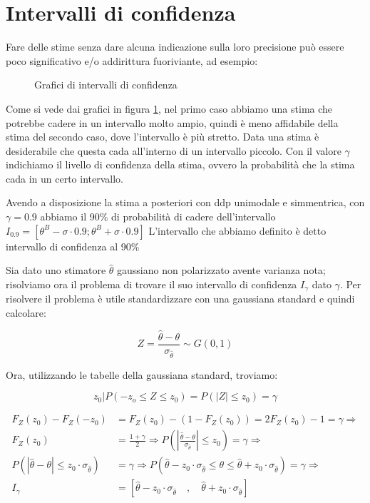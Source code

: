 \section{Intervalli di confidenza}
Fare delle stime senza dare alcuna indicazione sulla loro precisione può essere poco significativo e/o addirittura fuoriviante, ad esempio:

  \begin{figure}[htbp]
    \centering
    \caption{Grafici di intervalli di confidenza \label{fig:grafIntConf}}
  \end{figure}
Come si vede dai grafici in figura \ref{fig:grafIntConf}, nel primo caso abbiamo una stima che potrebbe cadere in un intervallo molto ampio, quindi è meno affidabile della stima del secondo caso, dove l'intervallo è più stretto.\newline
Data una stima è desiderabile che questa cada all'interno di un intervallo piccolo. Con il valore $\gamma$ indichiamo il livello di confidenza della stima, ovvero la probabilità che la stima cada in un certo intervallo.


\begin{esempio} %
Avendo a disposizione la stima a posteriori con ddp unimodale e simmentrica, con $\gamma=0.9$ abbiamo il 90\% di probabilità di cadere dell'intervallo $I_{0.9}=[\theta^B-\sigma \cdot 0.9 ; \theta^B + \sigma \cdot 0.9]$ \newline
[grafico]\newline
L'intervallo che abbiamo definito è detto intervallo di confidenza al 90\%
\end{esempio}

Sia dato uno stimatore $\hat{\theta}$ gaussiano non polarizzato avente varianza nota; risolviamo ora il problema di trovare il suo intervallo di confidenza $I_\gamma$ dato $\gamma$. Per risolvere il problema è utile standardizzare con una gaussiana standard e quindi calcolare:

  \[ Z=\frac{\hat{\theta}-\theta}{\sigma_{\hat{\theta}}}\sim G(0,1) \]
  
Ora, utilizzando le tabelle della gaussiana standard, troviamo:

  \[  z_0 | P(-z_o \leq Z \leq z_0)=P(\left| Z \right| \leq z_0 )=\gamma \]
  
  \[ 
    \begin{split}
      F_Z(z_0)-F_Z(-z_0) & =F_Z(z_0)-(1-F_Z(z_0))=2F_Z(z_0)-1=\gamma \Rightarrow \\
      F_Z(z_0) & =\frac{1+\gamma}{2} \Rightarrow P\left(\left| \frac{\hat{\theta}-\theta}{\sigma_{\hat{\theta}}} \right| \leq z_0 \right)=\gamma \Rightarrow \\
      P\left(\left| {\hat{\theta}-\theta}\right|\leq z_0\cdot \sigma_{\hat{\theta}} \right) & =\gamma\Rightarrow P(\hat{\theta}-z_0\cdot\sigma_{\hat{\theta}}\leq\theta\leq\hat{\theta}+z_0 \cdot\sigma_{\hat{\theta}})=\gamma \Rightarrow \\
      I_\gamma & =\left[\hat{\theta}-z_0\cdot\sigma_{\hat{\theta}} \quad,\quad\hat{\theta}+z_0\cdot\sigma_{\hat{\theta}}\right]
    \end{split}
  \]
  
